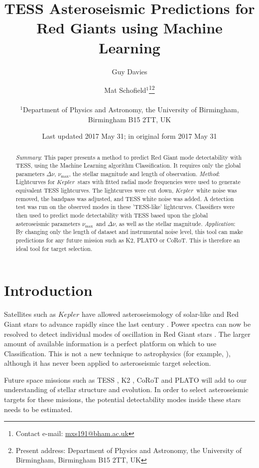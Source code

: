 \documentclass[a4paper,fleqn,usenatbib,useAMS]{mnras}
\title[TRG]{TESS Asteroseismic Predictions for Red Giants using Machine Learning}
\author[Mat Schofield]{Mat Schofield$^{1}$\thanks{Contact e-mail: \href{mailto:mxs191@bham.ac.uk}{mxs191@bham.ac.uk}}\thanks{Present address: Department of Physics and Astronomy, the University of Birmingham, Birmingham B15 2TT, UK}
\author[Guy Davies]{Guy Davies}
\\
$^{1}$Department of Physics and Astronomy, the University of Birmingham, Birmingham B15 2TT, UK}
\date{Last updated 2017 May 31; in original form 2017 May 31}
\newcommand{\numax}{\ensuremath{\nu_{\textrm{max}}}}
\newcommand{\dnu}{\ensuremath{\Delta\nu}}
\newcommand{\kep}{\ensuremath{Kepler}}
\begin{document}
\label{firstpage}
\pagerange{\pageref{firstpage}--\pageref{lastpage}}
\maketitle

\begin{abstract}
{\it Summary}: This paper presents a method to predict Red Giant mode detectability with TESS, using the Machine Learning algorithm Classification. It requires only the global parameters \dnu, \numax, the stellar magnitude and length of observation. \newline
{\it Method}: Lightcurves for \kep \ stars with fitted radial mode frequencies were used to generate equivalent TESS lightcurves. The lightcurves were cut down, \kep \ white noise was removed, the bandpass was adjusted, and TESS white noise was added. A detection test was run on the observed modes in these 'TESS-like' lightcurves. Classifiers were then used to predict mode detectability with TESS based upon the global asteroseismic parameters \numax \ and \dnu, as well as the stellar magnitude.\newline
{\it Application}: By changing only the length of dataset and instrumental noise level, this tool can make predictions for any future mission such as K2, PLATO or CoRoT. This is therefore an ideal tool for target selection.
\end{abstract}


\section{Introduction}

Satellites such as $Kepler$ have allowed asteroseismology of solar-like and Red Giant stars to advance rapidly since the last century \citet{chaplin_asteroseismology_2013}. Power spectra can now be resolved to detect individual modes of oscillation in Red Giant stars \citep{davies_asteroseismology_2016}. The larger amount of available information is a perfect platform on which to use Classification. This is not a new technique to astrophysics (for example, \citet{green_three-dimensional_2015}), although it has never been applied to asteroseismic target selection.

Future space missions such as TESS \citep{ricker_transiting_2014}, K2 \citep{howell_k2_2014}, CoRoT \citep{baglin_corot:_2006} and PLATO \citep{rauer_plato_2014} will add to our understanding of stellar structure and evolution. In order to select asteroseismic targets for these missions, the potential detectability modes inside these stars needs to be estimated.
\end{document}
